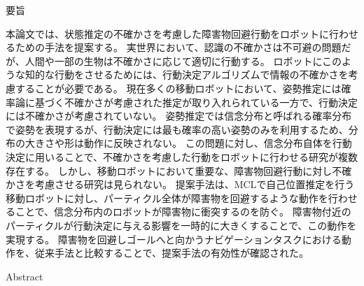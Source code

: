 \begin{center}
  要旨 \\%
  \vspace{0.7cm}{\LARGE \bf
    移動ロボットのための\\
    状態推定の不確かさを考慮した\\
    障害物回避行動の生成\\}
  \vspace{0.5cm}{\Large 鈴木 勇矢\\}
\end{center}
  \vspace{1.0cm}%
   \par

本論文では、状態推定の不確かさを考慮した障害物回避行動をロボットに行わせるための手法を提案する。
実世界において、認識の不確かさは不可避の問題だが、人間や一部の生物は不確かさに応じて適切に行動する。
ロボットにこのような知的な行動をさせるためには、行動決定アルゴリズムで情報の不確かさを考慮することが必要である。
現在多くの移動ロボットにおいて、姿勢推定には確率論に基づく不確かさが考慮された推定が取り入れられている一方で、行動決定には不確かさが考慮されていない。
姿勢推定では信念分布と呼ばれる確率分布で姿勢を表現するが、行動決定には最も確率の高い姿勢のみを利用するため、分布の大きさや形は動作に反映されない。
この問題に対し、信念分布自体を行動決定に用いることで、不確かさを考慮した行動をロボットに行わせる研究が複数存在する。
しかし、移動ロボットにおいて重要な、障害物回避行動に対し不確かさを考慮させる研究は見られない。
提案手法は、MCLで自己位置推定を行う移動ロボットに対し、パーティクル全体が障害物を回避するような動作を行わせることで、信念分布内のロボットが障害物に衝突するのを防ぐ。
障害物付近のパーティクルが行動決定に与える影響を一時的に大きくすることで、この動作を実現する。
障害物を回避しゴールへと向かうナビゲーションタスクにおける動作を、従来手法と比較することで、提案手法の有効性が確認された。

\newpage

\begin{center}
  Abstract \\%
  \vspace{0.7cm}{\Large \bf
    Generation of Obstacle Avoidance Behavior\\
    Considering Uncertainty of State Estimation\\
    for Mobile Robot\\}
  \vspace{0.5cm}{\Large Yuya SUZUKI\\}
\end{center}
  \vspace{1.0cm}%
   \par

